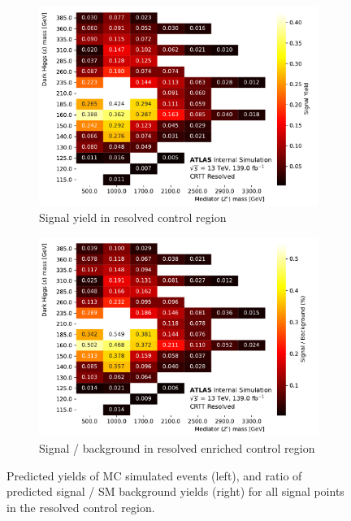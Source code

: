 \begin{figure}[htbp]
  \centering
  \begin{subfigure}{0.45\textwidth}
    \includegraphics[width=\textwidth]{Figures/5/SignalYields_CRTT_Resolved.pdf}
    \caption{Signal yield in resolved \ttbar control region}
    \label{fig:signal_yield_CRTT_resolved_CR}
    \end{subfigure} \hspace{1em}
  \begin{subfigure}{0.45\textwidth}
    \includegraphics[width=\textwidth]{Figures/5/SignalContaminations_CRTT_Resolved.pdf}
    \caption{Signal / background in resolved \ttbar enriched control region}
    \label{fig:signal_over_bkg_CRTT_resolved_CR}
    \end{subfigure}
  \caption[Signal contaminations in merged SR and CRTTbar]{Predicted yields of MC simulated events (left), and ratio of predicted signal / SM background yields (right) for all signal points in the resolved \ttbar control region.}
  \label{fig:signal_composition_CRTT_resolved}
\end{figure}

